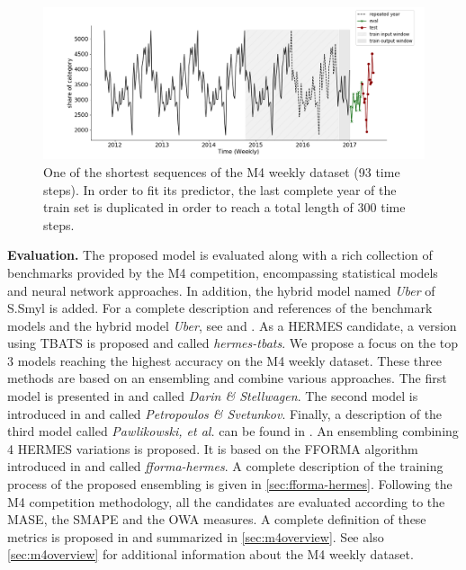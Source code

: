 \documentclass[10pt]{article} %
\begin{document}
\begin{figure}
  \centering
    \includegraphics[width=1.\linewidth]{m4_dataset}
  \caption{One of the shortest sequences of the M4 weekly dataset (93 time steps). In order to fit its predictor, the last complete year of the train set is duplicated in order to reach a total length of 300 time steps.}
\label{fig:m4dataset}
\end{figure}

\textbf{Evaluation. } The proposed model is evaluated along with a rich collection of benchmarks provided by the M4 competition, encompassing statistical models and neural network approaches. In addition, the hybrid model named \textit{Uber} of S.Smyl is added. For a complete description and references of the benchmark models and the hybrid model \textit{Uber}, see \citet{makridakis2020} and \citet{smyl2020}. As a HERMES candidate, a version using TBATS is proposed and called \textit{hermes-tbats}. We propose a focus on the top 3 models reaching the highest accuracy on the M4 weekly dataset. These three methods are based on an ensembling and combine various approaches.
The first model is presented in \citet{darin2020} and called \textit{Darin \& Stellwagen}. The second model is introduced in \citet{petropoulos2020} and called \textit{Petropoulos \& Svetunkov}. Finally, a description of the third model  called \textit{Pawlikowski, et al.} can be found in \citet{pawlikowski2020}. An ensembling combining 4 HERMES variations is proposed. It is based on the FFORMA algorithm introduced in \citet{montero2020} and called \textit{fforma-hermes}. A complete description of the training process of the proposed ensembling is given in \ref{sec:fforma-hermes}. Following the M4 competition methodology, all the candidates are evaluated according to the MASE, the SMAPE and the OWA measures. A complete definition of these metrics is proposed in \citet{makridakis2020} and summarized in \ref{sec:m4overview}. See also \ref{sec:m4overview} for additional information about the M4 weekly dataset.
\end{document}

